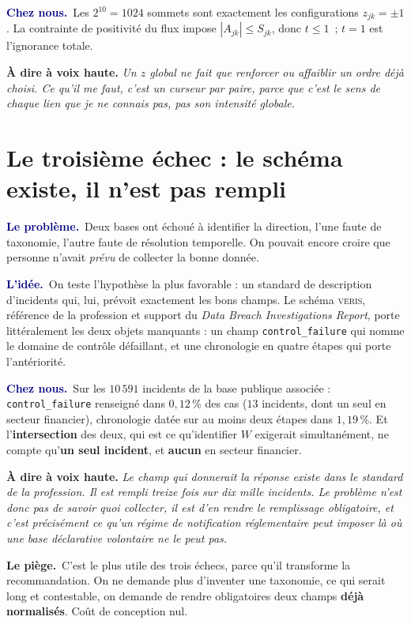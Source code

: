 \documentclass[11pt,a4paper]{article}
\newcommand{\lequoi}[1]{\smallskip\noindent\textcolor{navy}{\textbf{Le problème.}}\ #1\par}
\newcommand{\lidee}[1]{\smallskip\noindent\textcolor{navy}{\textbf{L'idée.}}\ #1\par}
\newcommand{\cheznous}[1]{\smallskip\noindent\textcolor{navy}{\textbf{Chez nous.}}\ #1\par}
\newcommand{\lepiege}[1]{\smallskip\noindent\textcolor{accent}{\textbf{Le piège.}}\ #1\par}
\newcommand{\laphrase}[1]{\begin{phrasebox}\textbf{À dire à voix haute.} \emph{#1}\end{phrasebox}}
\begin{document}
\cheznous{Les $2^{10}=1024$ sommets sont exactement les configurations $z_{jk}=\pm1$. La
contrainte de positivité du flux impose $|A_{jk}|\le S_{jk}$, donc $t\le1$~; $t=1$ est
l'ignorance totale.}

\laphrase{Un $z$ global ne fait que renforcer ou affaiblir un ordre déjà choisi. Ce qu'il me
faut, c'est un curseur par paire, parce que c'est le \emph{sens} de chaque lien que je ne
connais pas, pas son intensité globale.}

\section{Le troisième échec : le schéma existe, il n'est pas rempli}

\lequoi{Deux bases ont échoué à identifier la direction, l'une faute de taxonomie, l'autre
faute de résolution temporelle. On pouvait encore croire que personne n'avait \emph{prévu} de
collecter la bonne donnée.}

\lidee{On teste l'hypothèse la plus favorable : un standard de description d'incidents qui,
lui, prévoit exactement les bons champs. Le schéma \textsc{veris}, référence de la profession
et support du \emph{Data Breach Investigations Report}, porte littéralement les deux objets
manquants : un champ \texttt{control\_failure} qui nomme le domaine de contrôle défaillant, et
une chronologie en quatre étapes qui porte l'antériorité.}

\cheznous{Sur les $10\,591$ incidents de la base publique associée : \texttt{control\_failure}
renseigné dans \textbf{$0{,}12\,\%$} des cas ($13$ incidents, dont un seul en secteur
financier), chronologie datée sur au moins deux étapes dans \textbf{$1{,}19\,\%$}. Et
l'\textbf{intersection} des deux, qui est ce qu'identifier $W$ exigerait simultanément, ne
compte qu'\textbf{un seul incident}, et \textbf{aucun} en secteur financier.}

\laphrase{Le champ qui donnerait la réponse existe dans le standard de la profession. Il est
rempli treize fois sur dix mille incidents. Le problème n'est donc pas de savoir quoi collecter, il
est d'en
rendre le remplissage obligatoire, et c'est précisément ce qu'un régime de notification
réglementaire peut imposer là où une base déclarative volontaire ne le peut pas.}

\lepiege{C'est le plus utile des trois échecs, parce qu'il transforme la recommandation. On ne
demande plus d'inventer une taxonomie, ce qui serait long et contestable, on demande de rendre
obligatoires deux champs \textbf{déjà normalisés}. Coût de conception nul.}
\end{document}

